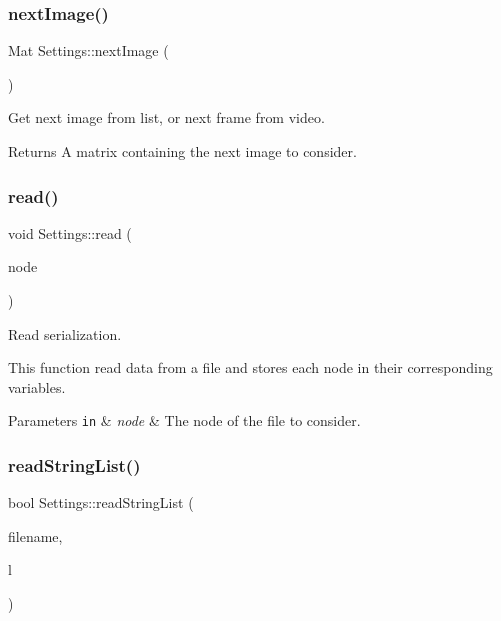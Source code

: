 \subsubsection{\texorpdfstring{next\+Image()}{nextImage()}}
{\footnotesize\ttfamily Mat Settings\+::next\+Image (\begin{DoxyParamCaption}{ }\end{DoxyParamCaption})}



Get next image from list, or next frame from video. 

\begin{DoxyReturn}{Returns}
A matrix containing the next image to consider. 
\end{DoxyReturn}
\mbox{\label{class_settings_a2d7841f8441095032e0f3b7d20adfd3f}} 
\subsubsection{\texorpdfstring{read()}{read()}}
{\footnotesize\ttfamily void Settings\+::read (\begin{DoxyParamCaption}\item[{const File\+Node \&}]{node }\end{DoxyParamCaption})}



Read serialization. 

This function read data from a file and stores each node in their corresponding variables.


\begin{DoxyParams}[1]{Parameters}
\mbox{\tt in}  & {\em node} & The node of the file to consider. \\
\hline
\end{DoxyParams}
\mbox{\label{class_settings_ab5f7cb92b11b6d324d9994ebcc2efa3f}} 
\subsubsection{\texorpdfstring{read\+String\+List()}{readStringList()}}
{\footnotesize\ttfamily bool Settings\+::read\+String\+List (\begin{DoxyParamCaption}\item[{const string \&}]{filename,  }\item[{vector$<$ string $>$ \&}]{l }\end{DoxyParamCaption})\hspace{0.3cm}{\ttfamily [static]}}



